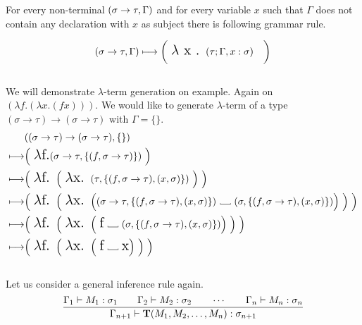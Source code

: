\documentclass[12pt,a4paper]{report}
\newcommand{\Lets}{Let us\xspace}
\newcommand{\lterm}{$\lambda$-term\xspace}
\newcommand{\tur}[3]{#1\vdash{}#2:#3}
\newcommand\Vtextvisiblespace[1][.3em]{%
  \mbox{\kern.06em\vrule height.3ex}%
  \vbox{\hrule width#1}%
  \hbox{\vrule height.3ex}}
\begin{document}
For every non-terminal $(\sigma \rightarrow \tau,\Gamma)$
and for every variable $x$ such that $\Gamma$ does not contain any 
declaration with $x$ as subject
there is following grammar rule.
 


$$ 
	( \sigma \rightarrow \tau , \Gamma )  \longmapsto
	\bigg( \mbox{ {\Large $\lambda$ x . }}( \tau ; \Gamma ,x:\sigma ) \quad \bigg)
$$\\

We will demonstrate \lterm generation on example. 
Again on $(\lambda f . (\lambda x . (f x) ))$. 
We would like to generate \lterm of a type 
$(\sigma \rightarrow \tau) \rightarrow (\sigma \rightarrow \tau)$
with $\Gamma = \{\}$.
\begin{align*}
	& ((\sigma \rightarrow \tau) \rightarrow (\sigma \rightarrow \tau),\{\}) \\ 
	\gar & \Big( \mbox{ {\Large $\lambda$f.}}
	  ( \sigma \rightarrow \tau , \{ (f,\sigma \rightarrow \tau) \} ) 
	~ \Big)
	\\
	\gar & 
	\Big( \mbox{ {\Large $\lambda$f. }}
		\Big( \mbox{ {\Large $\lambda$x. }}
	  	 	( \tau , \{ (f,\sigma \rightarrow \tau) , (x,\sigma) \} ) 
		~ \Big)  	 
	~ \Big)
	\\
	\gar & 
	\Big( \mbox{ {\Large $\lambda$f. }}
		\Big( \mbox{ {\Large $\lambda$x. }}	  	 	
	  	 	\Big( 
	  	 	  ( \sigma \rightarrow \tau , \{ (f,\sigma \rightarrow \tau) , (x,\sigma) \} ) 
			  \mbox{ \Vtextvisiblespace[1em] } 
			  ( \sigma , \{ (f,\sigma \rightarrow \tau) , (x,\sigma) \} )  \Big) 
		~ \Big)  	 
	 ~ \Big)
	\\
	\gar & 
	\Big( \mbox{ {\Large $\lambda$f. }}
		\Big( \mbox{ {\Large $\lambda$x. }}	  	 	
	  	 	\Big( 
	  	 	  \mbox{ {\Large f}} 
			  \mbox{ \Vtextvisiblespace[1em] } 
			  ( \sigma , \{ (f,\sigma \rightarrow \tau) , (x,\sigma) \} ) \Big) 
		~ \Big)  	 
	~ \Big)		
	\\
	\gar & 
	\Big( \mbox{ {\Large $\lambda$f. }}
		\Big( \mbox{ {\Large $\lambda$x. }}	  	 	
	  	 	\Big( 
	  	 	  \mbox{ {\Large f}} 
			  \mbox{ \Vtextvisiblespace[1em] } 
			  \mbox{{\Large x}} \Big) 
		~ \Big)  	 
	~ \Big)
\end{align*}~\\


\Lets consider a general inference rule again.
$$ 
\ruleIV
  { \tur{\Gamma_1}{M_1}{\sigma_1} }
  { \tur{\Gamma_2}{M_2}{\sigma_2} }
  { \dotsm }
  { \tur{\Gamma_n}{M_n}{\sigma_n} }
  { \tur{\Gamma_{n+1}}{ \mathbf{T}(M_1,M_2,\dots,M_n)}{\sigma_{n+1}} } 
$$
\end{document}
